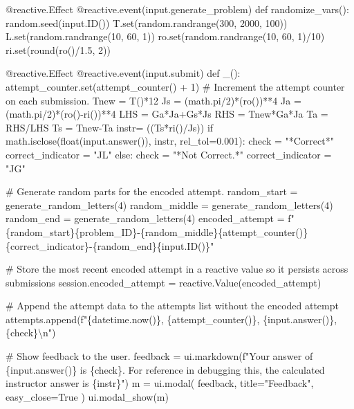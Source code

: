\documentclass[
  letterpaper,
  DIV=11,
  numbers=noendperiod]{scrreprt}
\newenvironment{Shaded}{\begin{snugshade}}{\end{snugshade}}
\newcommand{\NormalTok}[1]{\textcolor[rgb]{0.00,0.23,0.31}{#1}}
\begin{document}
\begin{Shaded}
\begin{Highlighting}[]
\NormalTok{    @reactive.Effect}
\NormalTok{    @reactive.event(input.generate\_problem)}
\NormalTok{    def randomize\_vars():}
\NormalTok{        random.seed(input.ID())}
\NormalTok{        T.set(random.randrange(300, 2000, 100))}
\NormalTok{        L.set(random.randrange(10, 60, 1))}
\NormalTok{        ro.set(random.randrange(10, 60, 1)/10)}
\NormalTok{        ri.set(round(ro()/1.5, 2))}
        
        
\NormalTok{    @reactive.Effect}
\NormalTok{    @reactive.event(input.submit)}
\NormalTok{    def \_():}
\NormalTok{        attempt\_counter.set(attempt\_counter() + 1)  \# Increment the attempt counter on each submission.}
\NormalTok{        Tnew = T()*12}
\NormalTok{        Js = (math.pi/2)*(ro())**4}
\NormalTok{        Ja = (math.pi/2)*(ro(){-}ri())**4}
\NormalTok{        LHS = Ga*Ja+Gs*Js}
\NormalTok{        RHS = Tnew*Ga*Ja}
\NormalTok{        Ta = RHS/LHS}
\NormalTok{        Ts = Tnew{-}Ta}
\NormalTok{        instr= ((Ts*ri()/Js))}
\NormalTok{        if math.isclose(float(input.answer()), instr, rel\_tol=0.001):}
\NormalTok{            check = "*Correct*"}
\NormalTok{            correct\_indicator = "JL"}
\NormalTok{        else:}
\NormalTok{            check = "*Not Correct.*"}
\NormalTok{            correct\_indicator = "JG"}

\NormalTok{        \# Generate random parts for the encoded attempt.}
\NormalTok{        random\_start = generate\_random\_letters(4)}
\NormalTok{        random\_middle = generate\_random\_letters(4)}
\NormalTok{        random\_end = generate\_random\_letters(4)}
\NormalTok{        encoded\_attempt = f"\{random\_start\}\{problem\_ID\}{-}\{random\_middle\}\{attempt\_counter()\}\{correct\_indicator\}{-}\{random\_end\}\{input.ID()\}"}

\NormalTok{        \# Store the most recent encoded attempt in a reactive value so it persists across submissions}
\NormalTok{        session.encoded\_attempt = reactive.Value(encoded\_attempt)}

\NormalTok{        \# Append the attempt data to the attempts list without the encoded attempt}
\NormalTok{        attempts.append(f"\{datetime.now()\}, \{attempt\_counter()\}, \{input.answer()\}, \{check\}\textbackslash{}n")}

\NormalTok{        \# Show feedback to the user.}
\NormalTok{        feedback = ui.markdown(f"Your answer of \{input.answer()\} is \{check\}. For reference in debugging this, the calculated instructor answer is \{instr\}")}
\NormalTok{        m = ui.modal(}
\NormalTok{            feedback,}
\NormalTok{            title="Feedback",}
\NormalTok{            easy\_close=True}
\NormalTok{        )}
\NormalTok{        ui.modal\_show(m)}


\end{Highlighting}
\end{Shaded}
\end{document}
